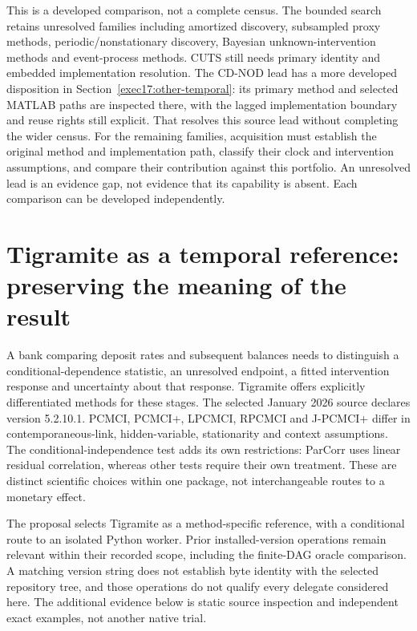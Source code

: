 This is a developed comparison, not a complete census. The bounded search
retains unresolved families including amortized discovery, subsampled
proxy methods, periodic/nonstationary discovery, Bayesian unknown-intervention
methods and event-process methods. CUTS still needs primary identity and
embedded implementation resolution. The CD-NOD lead has a more developed
disposition in Section~\ref{exec17:other-temporal}: its primary method and
selected MATLAB paths are inspected there, with the lagged implementation
boundary and reuse rights still explicit. That resolves this source lead
without completing the wider census. For the remaining families, acquisition
must establish the original method and implementation path, classify their
clock and intervention assumptions, and compare their contribution against
this portfolio. An unresolved lead is an evidence gap, not evidence that its
capability is absent. Each comparison can be developed independently.
\citep{exec14_pt_contract}
\label{exec14:python-temporal-end}


\section{Tigramite as a temporal reference: preserving the meaning of the result}
\label{exec23:tigramite-scope}
A bank comparing deposit rates and subsequent balances needs to distinguish a conditional-dependence statistic, an unresolved endpoint, a fitted intervention response and uncertainty about that response. Tigramite offers explicitly differentiated methods for these stages. The selected January 2026 source declares version 5.2.10.1. PCMCI, PCMCI+, LPCMCI, RPCMCI and J-PCMCI+ differ in contemporaneous-link, hidden-variable, stationarity and context assumptions. The conditional-independence test adds its own restrictions: ParCorr uses linear residual correlation, whereas other tests require their own treatment. These are distinct scientific choices within one package, not interchangeable routes to a monetary effect. \cite{exec23_tigramite_reuse_source,exec14_pt_tigramite}

The proposal selects Tigramite as a method-specific reference, with a conditional route to an isolated Python worker. Prior installed-version operations remain relevant within their recorded scope, including the finite-DAG oracle comparison. A matching version string does not establish byte identity with the selected repository tree, and those operations do not qualify every delegate considered here. \cite{runtime_tigramite_scope,runtime_networkx_dynamic} The additional evidence below is static source inspection and independent exact examples, not another native trial.

